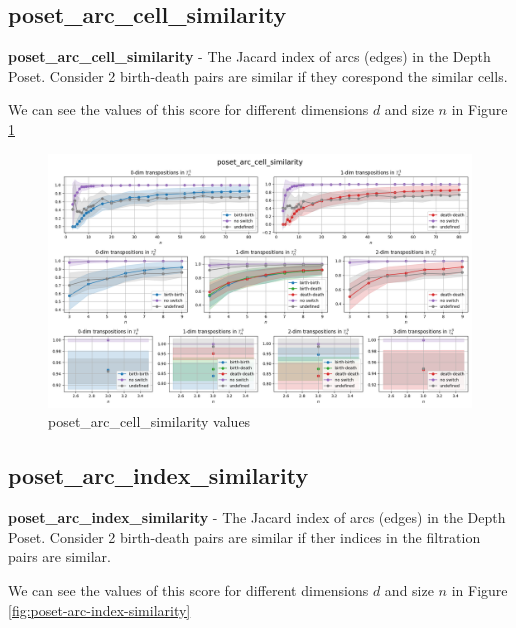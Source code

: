 \documentclass{article}
\begin{document}
\subsection{poset\_arc\_cell\_similarity}
\par \textbf{poset\_arc\_cell\_similarity} - The Jacard index of arcs (edges) in the Depth Poset.
    Consider 2 birth-death pairs are similar if they corespond the similar cells.
\par We can see the values of this score for different dimensions $d$ and size $n$ in Figure \ref{fig:poset-arc-cell-similarity}

\begin{figure}[h!]
    \centering
    \includegraphics[width=1.3\textwidth]{pics/torus-transpositions/similaritites/score=poset-arc-cell-similarity.png}
    \caption{poset\_arc\_cell\_similarity values}
    \label{fig:poset-arc-cell-similarity}
\end{figure}

\subsection{poset\_arc\_index\_similarity}
\par \textbf{poset\_arc\_index\_similarity} - The Jacard index of arcs (edges) in the Depth Poset.
    Consider 2 birth-death pairs are similar if ther indices in the filtration pairs are similar.
\par We can see the values of this score for different dimensions $d$ and size $n$ in Figure \ref{fig:poset-arc-index-similarity}
\end{document}
